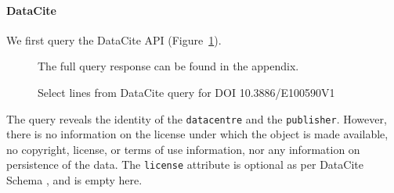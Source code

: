 \paragraph{DataCite}

We first query the DataCite API (Figure~\ref{fig:case1:datacite}).
\begin{figure}
\singlespacing






\caption{Select lines from DataCite query for DOI 10.3886/E100590V1}
\label{fig:case1:datacite}
\centering \footnotesize The full query response can be found in the appendix.
\end{figure}
%
The query reveals the identity of the \texttt{datacentre} and the \texttt{publisher}. However, there is no information on the license under which the object is made available, no copyright, license, or terms of use information, nor any information on persistence of the data. The \texttt{license} attribute is optional as per DataCite Schema \parencite{DataCiteMetadataWorkingGroupDataCiteMetadataSchema2017}, and is empty here.
 
